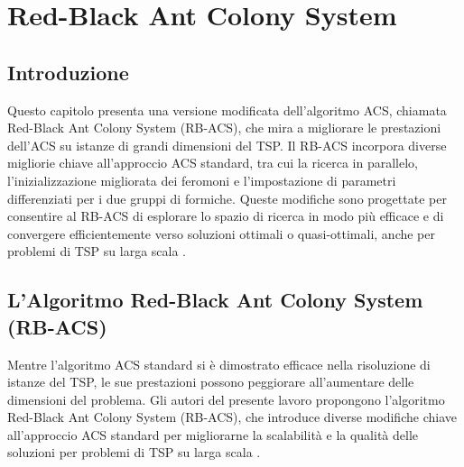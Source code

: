 
%

\chapter{Red-Black Ant Colony System}
\label{chapt:6}

\section{Introduzione}

Questo capitolo presenta una versione modificata dell'algoritmo \gls{ACS}, chiamata Red-Black Ant Colony System (\gls{RB-ACS}), che mira a migliorare le prestazioni dell'\gls{ACS} su istanze di grandi dimensioni del \gls{TSP}. Il \gls{RB-ACS} incorpora diverse migliorie chiave all'approccio  \gls{ACS} standard, tra cui la ricerca in parallelo, l'inizializzazione migliorata dei feromoni e l'impostazione di parametri differenziati per i due gruppi di formiche. Queste modifiche sono progettate per consentire al \gls{RB-ACS} di esplorare lo spazio di ricerca in modo più efficace e di convergere efficientemente verso soluzioni ottimali o quasi-ottimali, anche per problemi di \gls{TSP} su larga scala \cite{Hassan2013}.

\section{L'Algoritmo Red-Black Ant Colony System (\gls{RB-ACS})}
Mentre l'algoritmo  \gls{ACS} standard si è dimostrato efficace nella risoluzione di istanze del \gls{TSP}, le sue prestazioni possono peggiorare all'aumentare delle dimensioni del problema. Gli autori del presente lavoro propongono l'algoritmo Red-Black Ant Colony System (\gls{RB-ACS}), che introduce diverse modifiche chiave all'approccio  \gls{ACS} standard per migliorarne la scalabilità e la qualità delle soluzioni per problemi di \gls{TSP} su larga scala \cite{Hassan2013}.

